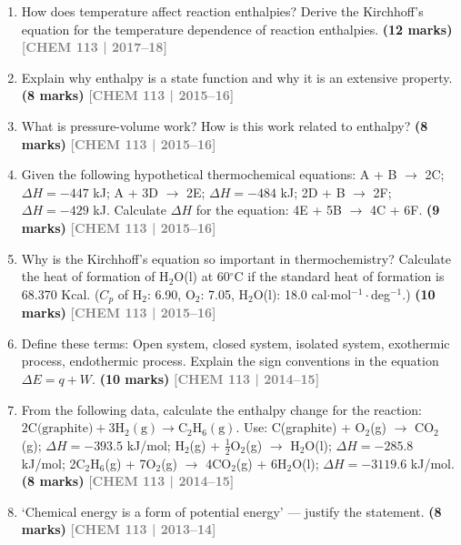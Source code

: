 \documentclass[12pt,a3paper]{article}
\newcommand{\yr}[1]{\hfill\textcolor{gray}{\small\textbf{[#1]}}}
\newcommand{\mk}[1]{\textcolor{orange!70!black}{\small\textbf{(#1 marks)}}}
\begin{document}
\begin{enumerate}
\item How does temperature affect reaction enthalpies? Derive the Kirchhoff's equation for the temperature dependence of reaction enthalpies. \mk{12}
\yr{CHEM 113 | 2017--18}



\item Explain why enthalpy is a state function and why it is an extensive property. \mk{8}
\yr{CHEM 113 | 2015--16}



\item What is pressure-volume work? How is this work related to enthalpy? \mk{8}
\yr{CHEM 113 | 2015--16}



\item Given the following hypothetical thermochemical equations: A + B $\rightarrow$ 2C; $\Delta H = -447$ kJ; A + 3D $\rightarrow$ 2E; $\Delta H = -484$ kJ; 2D + B $\rightarrow$ 2F; $\Delta H = -429$ kJ. Calculate $\Delta H$ for the equation: 4E + 5B $\rightarrow$ 4C + 6F. \mk{9}
\yr{CHEM 113 | 2015--16}



\item Why is the Kirchhoff's equation so important in thermochemistry? Calculate the heat of formation of H$_2$O(l) at 60$^\circ$C if the standard heat of formation is 68.370 Kcal. ($C_p$ of H$_2$: 6.90, O$_2$: 7.05, H$_2$O(l): 18.0 cal$\cdot$mol$^{-1}\cdot$deg$^{-1}$.) \mk{10}
\yr{CHEM 113 | 2015--16}



\item Define these terms: Open system, closed system, isolated system, exothermic process, endothermic process. Explain the sign conventions in the equation $\Delta E = q + W$. \mk{10}
\yr{CHEM 113 | 2014--15}



\item From the following data, calculate the enthalpy change for the reaction: $2\text{C(graphite)} + 3\text{H}_2(\text{g}) \rightarrow \text{C}_2\text{H}_6(\text{g})$. Use: C(graphite) + O$_2$(g) $\rightarrow$ CO$_2$(g); $\Delta H = -393.5$ kJ/mol; H$_2$(g) + $\frac{1}{2}$O$_2$(g) $\rightarrow$ H$_2$O(l); $\Delta H = -285.8$ kJ/mol; 2C$_2$H$_6$(g) + 7O$_2$(g) $\rightarrow$ 4CO$_2$(g) + 6H$_2$O(l); $\Delta H = -3119.6$ kJ/mol. \mk{8}
\yr{CHEM 113 | 2014--15}



\item `Chemical energy is a form of potential energy' --- justify the statement. \mk{8}
\yr{CHEM 113 | 2013--14}




\end{enumerate}
\end{document}
